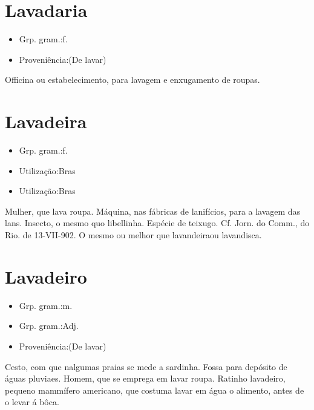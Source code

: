 \section{Lavadaria}
\begin{itemize}
\item {Grp. gram.:f.}
\end{itemize}
\begin{itemize}
\item {Proveniência:(De \textunderscore lavar\textunderscore )}
\end{itemize}
Officina ou estabelecimento, para lavagem e enxugamento de roupas.
\section{Lavadeira}
\begin{itemize}
\item {Grp. gram.:f.}
\end{itemize}
\begin{itemize}
\item {Utilização:Bras}
\end{itemize}
\begin{itemize}
\item {Utilização:Bras}
\end{itemize}
Mulher, que lava roupa.
Máquina, nas fábricas de lanifícios, para a lavagem das lans.
Insecto, o mesmo quo \textunderscore libellinha\textunderscore .
Espécie de teixugo. Cf. \textunderscore Jorn. do Comm.\textunderscore , do Rio. de 13-VII-902.
O mesmo ou melhor que \textunderscore lavandeira\textunderscore  ou \textunderscore lavandisca\textunderscore .
\section{Lavadeiro}
\begin{itemize}
\item {Grp. gram.:m.}
\end{itemize}
\begin{itemize}
\item {Grp. gram.:Adj.}
\end{itemize}
\begin{itemize}
\item {Proveniência:(De \textunderscore lavar\textunderscore )}
\end{itemize}
Cesto, com que nalgumas praias se mede a sardinha.
Fossa para depósito de águas pluviaes.
Homem, que se emprega em lavar roupa.
\textunderscore Ratinho lavadeiro\textunderscore , pequeno mammífero americano, que costuma lavar em água o alimento, antes de o levar á bôca.
